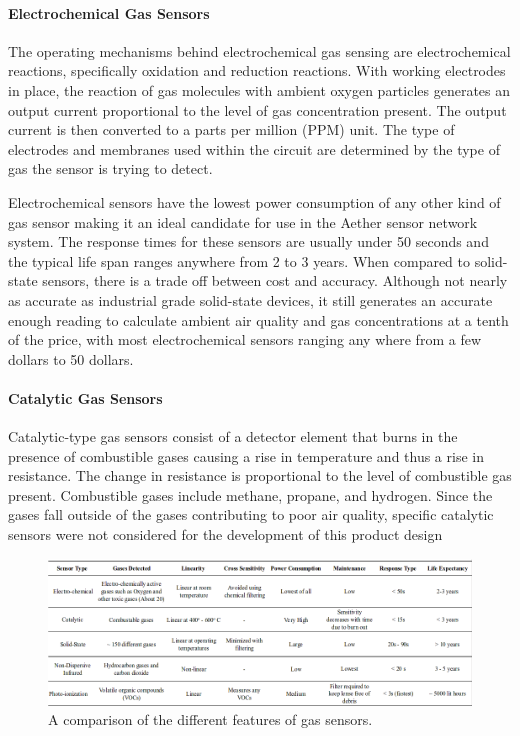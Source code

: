 \paragraph{Electrochemical Gas Sensors}
The operating mechanisms behind electrochemical gas sensing are electrochemical reactions, specifically oxidation and reduction reactions. With working electrodes in place, the reaction of gas molecules with ambient oxygen particles generates an output current proportional to the level of gas concentration present. The output current is then converted to a parts per million (PPM) unit. The type of electrodes and membranes used within the circuit are determined by the type of gas the sensor is trying to detect. 

Electrochemical sensors have the lowest power consumption of any other kind of gas sensor making it an ideal candidate for use in the Aether sensor network system. The response times for these sensors are usually under 50 seconds and the typical life span ranges anywhere from 2 to 3 years. When compared to solid-state sensors, there is a trade off between cost and accuracy. Although not nearly as accurate as industrial grade solid-state devices, it still generates an accurate enough reading to calculate ambient air quality and gas concentrations at a tenth of the price, with most electrochemical sensors ranging any where from a few dollars to 50 dollars. 
	
\paragraph{Catalytic Gas Sensors}
Catalytic-type gas sensors consist of a detector element that burns in the presence of combustible gases causing a rise in temperature and thus a rise in resistance. The change in resistance is proportional to the level of  combustible gas present. Combustible gases include methane, propane, and hydrogen. Since the gases fall outside of the gases contributing to poor air quality, specific catalytic sensors were not considered for the development of this product design

\begin{figure}
    \centering
    \includegraphics[width=6in]{figures/gas-sensor-comparison.png}
    \caption{A comparison of the different features of gas sensors.}
    \label{gas-sensor-comparison}
\end{figure}


